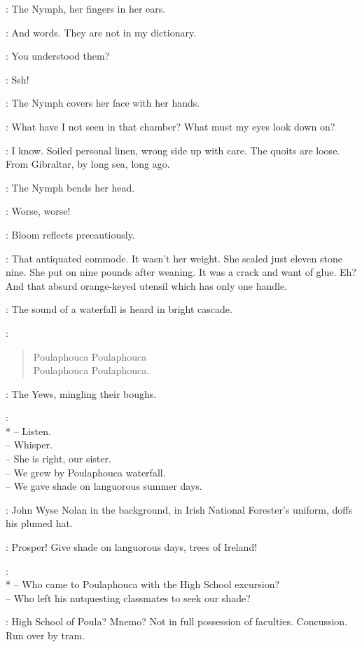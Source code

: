 :
The Nymph, her fingers in her ears.

\Nymph:
And words.
They are not in my dictionary.

\Bloom:
You understood them?

\Yews[2]:
Ssh!

:
The Nymph covers her face with her hands.

\Nymph:
What have I not seen in that chamber?
What must my eyes look down on?

\Bloom:
I know.
Soiled personal linen, wrong side up with care.
The quoits are loose.
From Gibraltar, by long sea, long ago.

:
The Nymph bends her head.

\Nymph:
Worse, worse!

:
Bloom reflects precautiously.

\Bloom:
That antiquated commode.
It wasn't her weight.
She scaled just eleven stone nine.
She put on nine pounds after weaning.
It was a crack and want of glue.
Eh?
And that absurd orange-keyed utensil which has only one handle.

:
The sound of a waterfall is heard in bright cascade.

\Waterfall:
\begin{verse}
    Poulaphouca Poulaphouca\\
%
    Poulaphouca Poulaphouca.
\end{verse}

:
The Yews, mingling their boughs.

\Yews:\\*
-- Listen.\\
-- Whisper.\\
-- She is right, our sister.\\
-- We grew by Poulaphouca waterfall.\\
-- We gave shade on languorous summer days.

:
John Wyse Nolan in the background, in Irish National Forester's uniform,
doffs his plumed hat.

\JohnWyse:
Prosper!
Give shade on languorous days, trees of Ireland!

\Yews:
\\*
-- Who came to Poulaphouca with the High School excursion?\\
-- Who left his nutquesting classmates to seek our shade?

\Bloom:
High School of Poula?
Mnemo?
Not in full possession of faculties.
Concussion.
Run over by tram.

